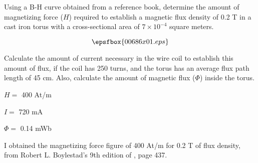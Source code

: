 

Using a B-H curve obtained from a reference book, determine the amount of magnetizing force ($H$) required to establish a magnetic flux density of 0.2 T in a cast iron torus with a cross-sectional area of $7 \times 10^{-4}$ square meters.

$$\epsfbox{00686x01.eps}$$

Calculate the amount of current necessary in the wire coil to establish this amount of flux, if the coil has 250 turns, and the torus has an average flux path length of 45 cm.  Also, calculate the amount of magnetic flux ($\Phi$) inside the torus.







$H =$ 400 At/m

$I =$ 720 mA

$\Phi =$ 0.14 mWb







I obtained the magnetizing force figure of 400 At/m for 0.2 T of flux density, from Robert L. Boylestad's 9th edition of , page 437.




